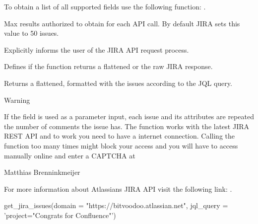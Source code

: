 \documentclass[a4paper]{book}
\begin{document}
\begin{Arguments}
\begin{ldescription}
\begin{itemize}
\end{itemize}

To obtain a list of all supported fields use the following function: .

\item[\code{maxResults}] Max results authorized to obtain for each API call. By default JIRA sets this value to 50 issues.

\item[\code{verbose}] Explicitly informs the user of the JIRA API request process.

\item[\code{as.data.frame}] Defines if the function returns a flattened  or the raw JIRA response.
\end{ldescription}
\end{Arguments}
%
\begin{Value}
Returns a flattened, formatted  with the issues according to the JQL query.
\end{Value}
%
\begin{Section}{Warning}

If the  field is used as a  parameter input, each issue and its attributes are repeated the number of comments the issue has. The function works with the latest JIRA REST API and to work you need to have a internet connection. Calling the function too many times might block your access and you will have to access manually online and enter a CAPTCHA at 
\end{Section}
%
\begin{Author}\relax
Matthias Brenninkmeijer 
\end{Author}
%
\begin{SeeAlso}\relax
For more information about Atlassians JIRA API visit the following link: .
\end{SeeAlso}
%
\begin{Examples}
\begin{ExampleCode}
get_jira_issues(domain = "https://bitvoodoo.atlassian.net",
                jql_query = 'project="Congrats for Confluence"')
\end{ExampleCode}
\end{Examples}
\end{document}
